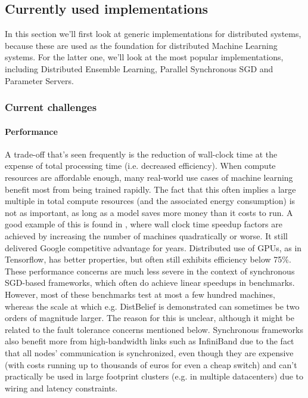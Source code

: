 \subsection{Currently used implementations}
In this section we'll first look at generic implementations for distributed systems, because these are used as the foundation for distributed Machine Learning systems. For the latter one, we'll look at the most popular implementations, including Distributed Ensemble Learning, Parallel Synchronous SGD and Parameter Servers.



\subsubsection{Current challenges}
\paragraph{Performance}

A trade-off that’s seen frequently is the reduction of wall-clock time at the expense of total processing time (i.e. decreased efficiency). When compute resources are affordable enough, many real-world use cases of machine learning benefit most from being trained rapidly. The fact that this often implies a large multiple in total compute resources (and the associated energy consumption) is not as important, as long as a model saves more money than it costs to run.  A good example of this is found in \citet{DistBelief2012}, where wall clock time speedup factors are achieved by increasing the number of machines quadratically or worse. It still delivered Google competitive advantage for years. Distributed use of GPUs, as in Tensorflow, has better properties, but often still exhibits efficiency below 75\%.
These performance concerns are much less severe in the context of synchronous SGD-based frameworks, which often do achieve linear speedups in benchmarks. However, most of these benchmarks test at most a few hundred machines, whereas the scale at which e.g. DistBelief is demonstrated can sometimes be two orders of magnitude larger. The reason for this is unclear, although it might be related to the fault tolerance concerns mentioned below. Synchronous frameworks also benefit more from high-bandwidth links such as InfiniBand due to the fact that all nodes' communication is synchronized, even though they are expensive (with costs running up to thousands of euros for even a cheap switch) and can't practically be used in large footprint clusters (e.g. in multiple datacenters) due to wiring and latency constraints.

